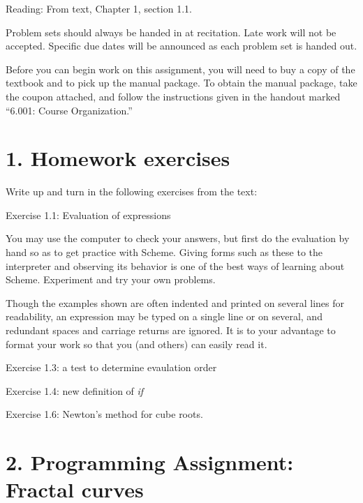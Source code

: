 \vpar
Reading: From text, Chapter 1, section 1.1.

Problem sets should always be handed in at recitation.  Late work will
not be accepted.
Specific due dates will be announced as each problem set is handed
out.

Before you can begin work on this assignment, you will need to buy
a copy of the textbook and to pick up
the manual package.  To obtain the manual package, take the coupon
attached, and follow the instructions
given in the handout marked ``6.001: Course Organization.''

\chapter{1. Homework exercises}

Write up and turn in the following exercises from the text:

\beginbullets

\bpar
Exercise 1.1:  Evaluation of expressions

\ftpar{\hskip \parindent}
You may use the computer to check your answers, but first do the
evaluation by hand so as to get practice with Scheme.
Giving forms such as these to the interpreter and observing its
behavior is one of the best ways of learning about Scheme.
Experiment and try your own problems.  

\ftpar{\hskip \parindent}
Though the examples shown are
often indented and printed on several lines for readability, an
expression may be typed on a single line or on several, and redundant
spaces and carriage returns are ignored.  It is to your advantage to
format your work so that you (and others) can easily read it.


\bpar
Exercise 1.3: a test to determine evaulation order

\bpar
Exercise 1.4: new definition of {\it if}

\bpar
Exercise 1.6: Newton's method for cube roots.

\chapter{2. Programming Assignment: Fractal curves}

